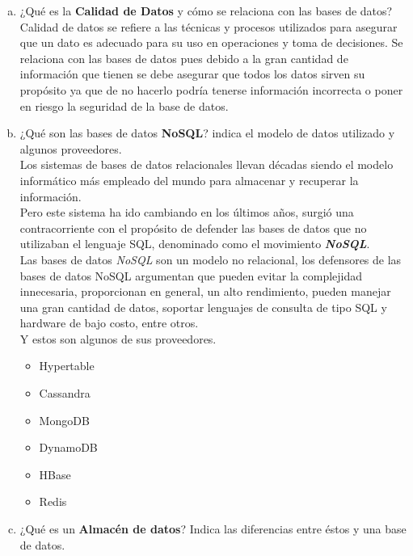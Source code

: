 \documentclass[letterpaper,12pt]{article}
\begin{document}
            \begin{enumerate}[a)]

            \item ¿Qué es la \textbf{Calidad de Datos} y cómo se relaciona con las bases de datos? \\
        	Calidad de datos se refiere a las técnicas y procesos utilizados para asegurar que un dato es adecuado para su uso en operaciones y toma de decisiones. Se relaciona con las bases de datos pues debido a la gran cantidad de información que tienen se debe asegurar que todos los datos sirven su propósito ya que de no hacerlo podría tenerse información incorrecta o poner en riesgo la seguridad de la base de datos.

            \item ¿Qué son las bases de datos \textbf{NoSQL}? indica el modelo de datos utilizado y algunos proveedores.\\

         Los sistemas de bases de datos relacionales llevan décadas siendo el modelo informático más empleado del mundo para almacenar y recuperar la información.\\

         Pero este sistema ha ido cambiando en los últimos años, surgió una contracorriente con el propósito de defender las bases de datos que no utilizaban el lenguaje SQL, denominado como el movimiento \textbf{\textit{ NoSQL}}. \\

         Las bases de datos \textit{NoSQL} son un modelo no relacional, los defensores de las bases de datos NoSQL argumentan que pueden evitar la complejidad innecesaria, proporcionan en general, un alto rendimiento, pueden manejar una gran cantidad de datos, soportar lenguajes de consulta de tipo SQL y hardware de bajo costo, entre otros.\\

          Y estos son algunos de sus proveedores.
          \begin{itemize}
            \item Hypertable
            \item Cassandra
            \item MongoDB
            \item DynamoDB
            \item HBase
            \item Redis

          \end{itemize}




            \item ¿Qué es un \textbf{Almacén de datos}? Indica las diferencias entre éstos y una base de datos.

            \end{enumerate}
\end{document}
